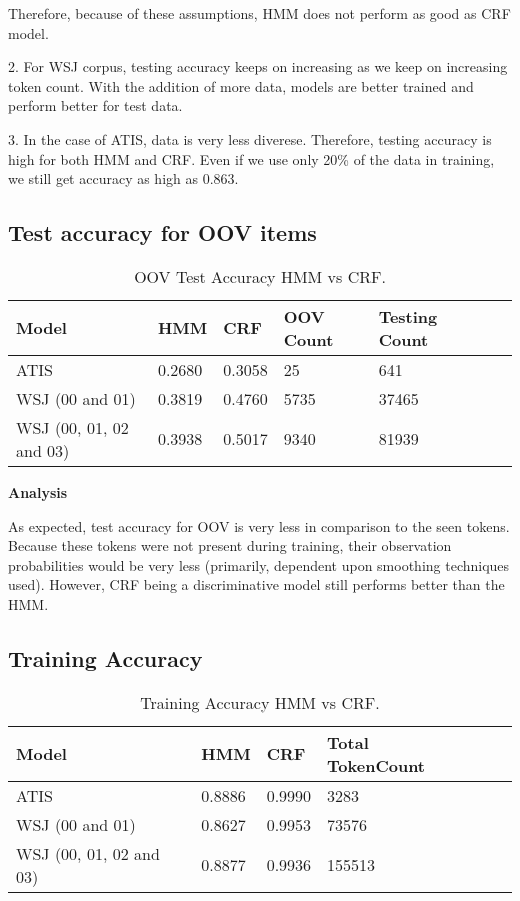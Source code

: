 Therefore, because of these assumptions, HMM does not perform as good as CRF model.

2. For WSJ corpus, testing accuracy keeps on increasing as we keep on increasing token count. With the addition of more data, models are better trained and perform better for test data. 

3. In the case of ATIS, data is very less diverese. Therefore, testing accuracy is high for both HMM and CRF. Even if we use only 20\% of the data in training, we still get accuracy as high as 0.863.

\subsection {Test accuracy for OOV items}

\begin{center}	
	\begin{table}[ht]
  	\centering
   	\begin{tabular}{| l | l | l | l | l | l | l |}
    	\hline
        Model & HMM & CRF & OOV Count & Testing Count \\ \hline
        ATIS & 0.2680 & 0.3058 &  25 & 641 \\ \hline
        WSJ (00 and 01) & 0.3819 & 0.4760 & 5735 & 37465 \\ \hline
	WSJ (00, 01, 02 and 03) & 0.3938 & 0.5017 & 9340 & 81939 \\ \hline
    	\end{tabular}
    	\caption{OOV Test Accuracy HMM vs CRF. }
    	\end{table}%
\end{center}

{\bfseries Analysis}

As expected, test accuracy for OOV is very less in comparison to the seen tokens. Because these tokens were not present during training, their observation probabilities would be very less (primarily, dependent upon smoothing techniques used). However, CRF being a discriminative model still performs better than the HMM.

\subsection {Training Accuracy}

\begin{center}	
	\begin{table}[ht]
  	\centering
   	\begin{tabular}{| l | l | l | l | l | l |}
    	\hline
        Model & HMM & CRF & Total TokenCount \\ \hline
        ATIS & 0.8886 & 0.9990 &  3283 \\ \hline
        WSJ (00 and 01) & 0.8627 & 0.9953 & 73576 \\ \hline
	WSJ (00, 01, 02 and 03) & 0.8877 & 0.9936 & 155513 \\ \hline
    	\end{tabular}
    	\caption{Training Accuracy HMM vs CRF. }
    	\end{table}%
\end{center}

